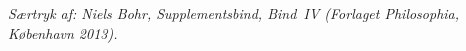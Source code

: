 \documentclass[12pt,a4paper]{article}
\begin{document}
\thispagestyle{fancy}
{\footnotesize\itshape Særtryk af: Niels Bohr, \emph{Supplementsbind}, Bind~IV
 (Forlaget Philosophia, K\o{}benhavn 2013).\par}
\medskip


\end{document}
